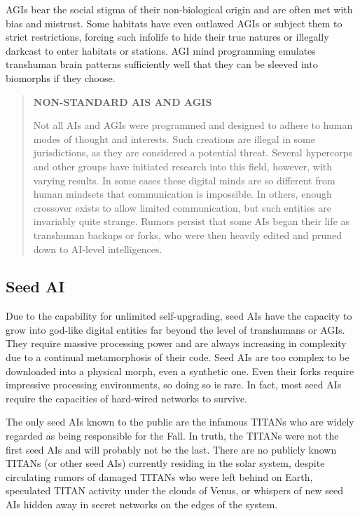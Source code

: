 AGIs bear the social stigma of their non-biological 
origin and are often met with bias and mistrust. Some 
habitats have even outlawed AGIs or subject them to 
strict restrictions, forcing such infolife to hide their 
true natures or illegally darkcast to enter habitats or 
stations. AGI mind programming emulates transhuman
brain patterns sufficiently well that they can be
sleeved into biomorphs if they choose.

\begin{quotation}
\textbf{NON-STANDARD AIS AND AGIS}

Not all AIs and AGIs were programmed and designed
to adhere to human modes of thought
and interests. Such creations are illegal in some
jurisdictions, as they are considered a potential
threat. Several hypercorps and other groups
have initiated research into this field, however,
with varying results. In some cases these digital
minds are so different from human mindsets that
communication is impossible. In others, enough
crossover exists to allow limited communication,
but such entities are invariably quite strange.
Rumors persist that some AIs began their
life as transhuman backups or forks, who were
then heavily edited and pruned down to AI-level
intelligences.
\end{quotation}

\subsection{Seed AI}

Due to the capability for unlimited self-upgrading, 
seed AIs have the capacity to grow into god-like 
digital entities far beyond the level of transhumans 
or AGIs. They require massive processing power and 
are always increasing in complexity due to a continual 
metamorphosis of their code. Seed AIs are too complex
to be downloaded into a physical morph, even
a synthetic one. Even their forks require impressive 
processing environments, so doing so is rare. In fact, 
most seed AIs require the capacities of hard-wired 
networks to survive.

The only seed AIs known to the public are the 
infamous TITANs who are widely regarded as being 
responsible for the Fall. In truth, the TITANs were 
not the first seed AIs and will probably not be the last. 
There are no publicly known TITANs (or other seed 
AIs) currently residing in the solar system, despite 
circulating rumors of damaged TITANs who were left 
behind on Earth, speculated TITAN activity under the 
clouds of Venus, or whispers of new seed AIs hidden 
away in secret networks on the edges of the system.


